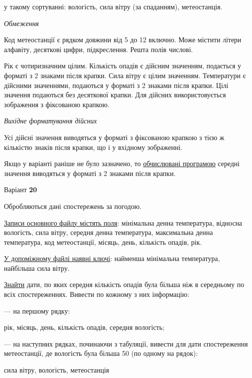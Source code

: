 \documentclass[11pt, ukrainian]{article}
\begin{document}
{\noindent}у такому сортуванні: вологість, сила вітру (за спаданням), метеостанція.


\bigskip\textit{Обмеження}

Код метеостанції є рядком довжини від 5 до 12 включно.
Може містити літери алфавіту, десяткові цифри, підкреслення. Решта полів числові.

Рік є чотиризначним цілим.
Кількість опадів є дійсним значенням, подається у форматі з 2 знаками після крапки.
Сила вітру є цілим значенням.
Температури є дійсними значеннями, подаються у форматі з 2 знаками після крапки.
Цілі значення подаються без десяткової крапки.
Для дійсних використовується зображення з фіксованою крапкою.

\textit{Вихідне форматування дійсних}

Усі дійсні значення виводяться у форматі з фіксованою крапкою з тією ж кількістю знаків після крапки, що і у вхідному зображенні.

Якщо у варіанті раніше не було зазначено, то \underline{обчислювані програмою} середні значення виводяться у форматі з 2 знаками після крапки.


\par
\newpage
{\center Варіант  \No \textbf { 20 }\par}
\bigskip
Обробляються дані спостережень за погодою. 

\underline{Записи основного файлу містять поля}: мінімальна денна температура, відносна вологість, сила вітру, середня денна температура, максимальна денна температура, код метеостанції, місяць, день, кількість опадів, рік.

\underline{У допоміжному файлі наявні ключі}: найменша мінімальна температура, найбільша сила вітру.

\underline{Знайти} дати, по яких середня кількість опадів була більша ніж в середньому по всіх спостереженнях. Вивести по кожному з них інформацію:\par
{\noindent}--- на першому рядку:\par
рік, місяць, день, кількість опадів, середня вологість;

{\noindent}--- на наступних рядках, починаючи з табуляції, вивести для дати спостереження метеостанції, де вологість була більша 50 (по одному на рядок):\par
сила вітру, вологість, метеостанція
\end{document}
